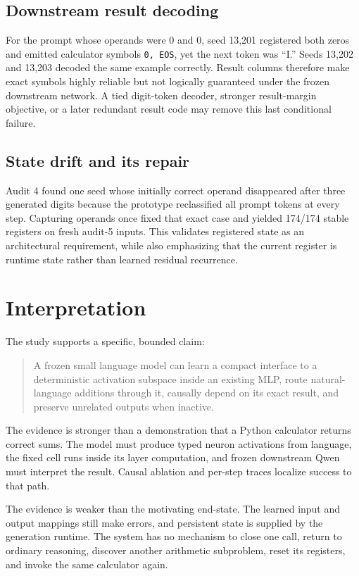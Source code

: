 \documentclass[11pt]{article}
\newcommand{\code}[1]{\texttt{#1}}
\begin{document}
\subsection{Downstream result decoding}

For the prompt whose operands were $0$ and $0$, seed 13,201 registered both
zeros and emitted calculator symbols \code{0, EOS}, yet the next token was
``I.'' Seeds 13,202 and 13,203 decoded the same example correctly. Result
columns therefore make exact symbols highly reliable but not logically
guaranteed under the frozen downstream network. A tied digit-token decoder,
stronger result-margin objective, or a later redundant result code may remove
this last conditional failure.

\subsection{State drift and its repair}

Audit 4 found one seed whose initially correct operand disappeared after three
generated digits because the prototype reclassified all prompt tokens at every
step. Capturing operands once fixed that exact case and yielded 174/174 stable
registers on fresh audit-5 inputs. This validates registered state as an
architectural requirement, while also emphasizing that the current register
is runtime state rather than learned residual recurrence.

\section{Interpretation}

The study supports a specific, bounded claim:

\begin{quote}
A frozen small language model can learn a compact interface to a deterministic
activation subspace inside an existing MLP, route natural-language additions
through it, causally depend on its exact result, and preserve unrelated outputs
when inactive.
\end{quote}

The evidence is stronger than a demonstration that a Python calculator
returns correct sums. The model must produce typed neuron activations from
language, the fixed cell runs inside its layer computation, and frozen
downstream Qwen must interpret the result. Causal ablation and per-step traces
localize success to that path.

The evidence is weaker than the motivating end-state. The learned input and
output mappings still make errors, and persistent state is supplied by the
generation runtime. The system has no mechanism to close one call, return to
ordinary reasoning, discover another arithmetic subproblem, reset its
registers, and invoke the same calculator again.
\end{document}

